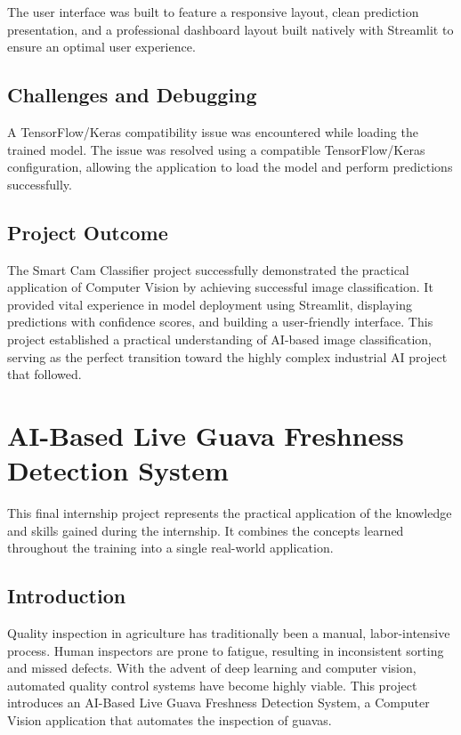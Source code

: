 The user interface was built to feature a responsive layout, clean prediction presentation, and a professional dashboard layout built natively with Streamlit to ensure an optimal user experience.

\subsection{Challenges and Debugging}

A TensorFlow/Keras compatibility issue was encountered while loading the trained model. The issue was resolved using a compatible TensorFlow/Keras configuration, allowing the application to load the model and perform predictions successfully.

\subsection{Project Outcome}

The Smart Cam Classifier project successfully demonstrated the practical application of Computer Vision by achieving successful image classification. It provided vital experience in model deployment using Streamlit, displaying predictions with confidence scores, and building a user-friendly interface. This project established a practical understanding of AI-based image classification, serving as the perfect transition toward the highly complex industrial AI project that followed.



\section{AI-Based Live Guava Freshness Detection System}

This final internship project represents the practical application of the knowledge and skills gained during the internship. It combines the concepts learned throughout the training into a single real-world application.

\subsection{Introduction}

Quality inspection in agriculture has traditionally been a manual, labor-intensive process. Human inspectors are prone to fatigue, resulting in inconsistent sorting and missed defects. With the advent of deep learning and computer vision, automated quality control systems have become highly viable. This project introduces an AI-Based Live Guava Freshness Detection System, a Computer Vision application that automates the inspection of guavas.

